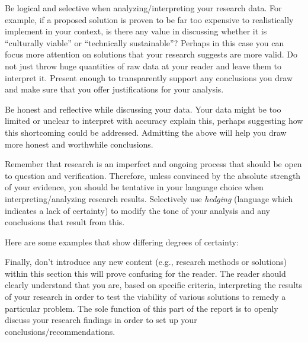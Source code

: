 \documentclass[peerreview]{IEEEtran} %
\begin{document}
Be logical and selective when analyzing/interpreting your research data.  For example, if a proposed solution is proven to be far too expensive to realistically implement in your context, is there any value in discussing whether it is ``culturally viable'' or ``technically sustainable''? Perhaps in this case you can focus more attention on solutions that your research suggests are more valid.  Do not just throw huge quantities of raw data at your reader and leave them to interpret it. Present enough to transparently support any conclusions you draw and make sure that you offer justifications for your analysis.  

Be honest and reflective while discussing your data. Your data might be too limited or unclear to interpret with
accuracy explain this, perhaps suggesting how this shortcoming could be addressed. Admitting the above will help you draw more honest and worthwhile conclusions.

Remember that research is an imperfect and ongoing process that should be open to question and verification. Therefore, unless convinced by the absolute strength of your evidence, you should be tentative in your language choice when interpreting/analyzing research results. Selectively use {\em hedging} (language which indicates a lack of certainty) to modify the tone of your analysis and any conclusions that result from this. 

Here are some examples that show differing degrees of certainty:

Finally, don’t introduce any new content (e.g., research methods or solutions) within this section this will prove confusing for the reader. The reader should clearly understand that you are, based on specific criteria, interpreting the results of your research in order to test the viability of various solutions to remedy a particular problem. The sole function of this part of the report is to openly discuss your research findings in order to set up your conclusions/recommendations.
\end{document}
